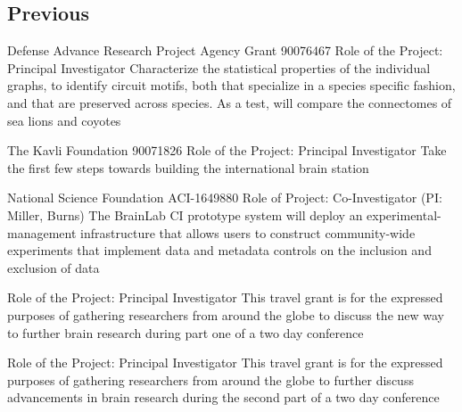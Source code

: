 \documentclass[10pt,colorlinks=true,urlcolor=blue]{moderncv}
\begin{document}
\subsection{Previous}
{\newline Defense Advance Research Project Agency Grant 90076467
\newline Role of the Project: Principal Investigator
\newline Characterize the statistical properties of the individual graphs, to identify circuit motifs,
both that specialize in a species specific fashion, and that are preserved across species.
As a test, will compare the connectomes of sea lions and coyotes}{}{}{}{}

{\newline The Kavli Foundation 90071826
\newline Role of the Project: Principal Investigator
\newline Take the first few steps towards building the international brain station}{}{}{}{}

{\newline National Science Foundation ACI-1649880
\newline Role of Project: Co-Investigator (PI: Miller, Burns)
\newline The BrainLab CI prototype system will deploy an experimental-management
infrastructure that allows users to construct community-wide experiments that implement
data and metadata controls on the inclusion and exclusion of data}{}{}{}{}

{\newline Role of the Project: Principal Investigator
\newline This travel grant is for the expressed purposes of gathering researchers from around the
globe to discuss the new way to further brain research during part one of a two day
conference}{}{}{}{}

{\newline Role of the Project: Principal Investigator
\newline This travel grant is for the expressed purposes of gathering researchers from
around the globe to further discuss advancements in brain research during the
second part of a two day conference}{}{}{}{}
\end{document}
